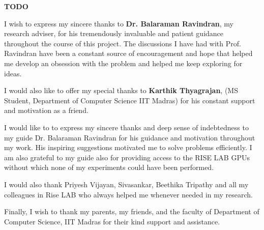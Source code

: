 \acknowledgements
\textbf{TODO} \par
I wish to express my sincere thanks to \textbf{Dr. Balaraman Ravindran}, my research
adviser, for his tremendously invaluable and patient guidance throughout the course of
this project. The discussions I have had with Prof. Ravindran have been a constant source
of encouragement and hope that helped me develop an obsession with the problem and
helped me keep exploring for ideas. \par

I would also like to offer my special thanks to \textbf{Karthik Thyagrajan}, (MS Student, Department of Computer Science IIT Madras) for his constant support and motivation as a friend. \par

I would like to to express my sincere thanks and deep sense of indebtedness to
my guide Dr. Balaraman Ravindran for his guidance and motivation throughout my
work. His inspiring suggestions motivated me to solve problems efficiently. I am
also grateful to my guide also for providing access to the RISE LAB GPUs without which none of my experiments could have been performed.\par

I would also thank Priyesh Vijayan, Sivasankar, Beethika Tripathy and  all my colleagues in Rise LAB who always helped me whenever needed in my research. \par

Finally, I wish to thank my parents, my friends, and the faculty of Department of
Computer Science, IIT Madras for their kind support and assistance.


